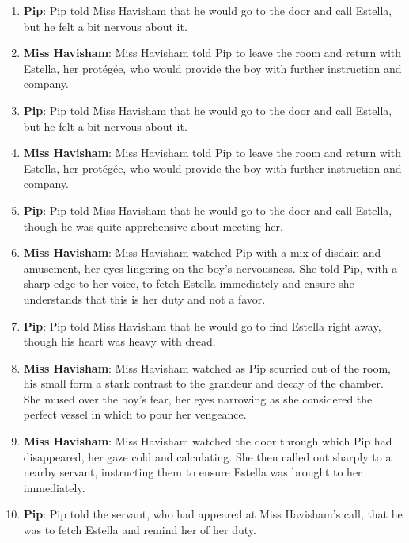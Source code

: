 \documentclass[10pt]{article}
\begin{document}
\begin{enumerate}\setlength{\itemsep}{1pt}\small

\item \textbf{Pip}: Pip told Miss Havisham that he would go to the door and call Estella, but he felt a bit nervous about it.

\item \textbf{Miss Havisham}: Miss Havisham told Pip to leave the room and return with Estella, her protégée, who would provide the boy with further instruction and company.

\item \textbf{Pip}: Pip told Miss Havisham that he would go to the door and call Estella, but he felt a bit nervous about it.

\item \textbf{Miss Havisham}: Miss Havisham told Pip to leave the room and return with Estella, her protégée, who would provide the boy with further instruction and company.

\item \textbf{Pip}: Pip told Miss Havisham that he would go to the door and call Estella, though he was quite apprehensive about meeting her.

\item \textbf{Miss Havisham}: Miss Havisham watched Pip with a mix of disdain and amusement, her eyes lingering on the boy's nervousness. She told Pip, with a sharp edge to her voice, to fetch Estella immediately and ensure she understands that this is her duty and not a favor.

\item \textbf{Pip}: Pip told Miss Havisham that he would go to find Estella right away, though his heart was heavy with dread.

\item \textbf{Miss Havisham}: Miss Havisham watched as Pip scurried out of the room, his small form a stark contrast to the grandeur and decay of the chamber. She mused over the boy's fear, her eyes narrowing as she considered the perfect vessel in which to pour her vengeance.

\item \textbf{Miss Havisham}: Miss Havisham watched the door through which Pip had disappeared, her gaze cold and calculating. She then called out sharply to a nearby servant, instructing them to ensure Estella was brought to her immediately.

\item \textbf{Pip}: Pip told the servant, who had appeared at Miss Havisham's call, that he was to fetch Estella and remind her of her duty.


\end{enumerate}
\end{document}
